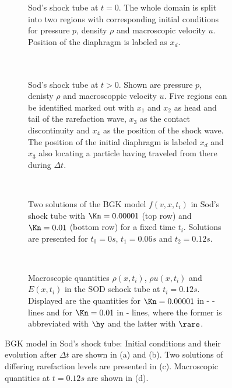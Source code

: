 \begin{figure}[H]
	\begin{subfigure}{.45\textwidth}
		\centering
		
		\caption{Sod's shock tube at \(t=0\). The whole domain is split into two regions with corresponding initial conditions for pressure \(p\), density \(\rho\) and macroscopic velocity \(u\). Position of the diaphragm is labeled as \(x_d\).\\ \\ \\}
		\label{Fig:SodTime}
	\end{subfigure}\hfill
	\begin{subfigure}{.45\textwidth}
		\centering
		
		\caption{Sod's shock tube at \(t>0\). Shown are pressure \(p\), denisty \(\rho\)  and macroscoppic velocity \(u\). Five regions can be identified marked out with \(x_1\) and \(x_2\) as head and tail of the rarefaction wave, \(x_3\) as the contact discontinuity and \(x_4\) as the position of the shock wave. The position of the initial diaphragm is labeled \(x_d\) and \(x_3\) also locating a particle having traveled from there during \(\Delta t\).}
		\label{Fig:SodTime0}
	\end{subfigure}\\ \vfill
	\begin{subfigure}{\textwidth}
		\centering
		
		\caption{Two solutions of the BGK model \(f(v,x,t_i)\) in Sod's shock tube with \(\Kn=0.00001\) (top row) and \(\Kn=0.01\) (bottom row) for a fixed time \(t_i\). Solutions are presented for \(t_0=0s\), \(t_1=0.06s\) and \(t_2=0.12s\).}
		\label{Fig:ExamplesSod}
	\end{subfigure}\\
	\begin{subfigure}{\textwidth}
		
		\caption{Macroscopic quantities \(\rho(x,t_i)\), \(\rho u(x,t_i)\) and \(E(x,t_i)\) in the SOD schock tube at \(t_i=0.12s\). Displayed are the quantities for \(\Kn=0.00001\)  in - - lines and for \(\Kn=0.01\) in - lines, where the former is abbreviated with \(\hy\) and the latter with \(\rare\).}
	\end{subfigure}\caption{BGK model in Sod's shock tube: Initial conditions and their evolution after \(\Delta t\) are shown in (a) and (b). Two solutions of differing rarefaction levels are presented in (c). Macroscopic quantities at \(t=0.12s\) are shown in (d).}
\end{figure}

%	
